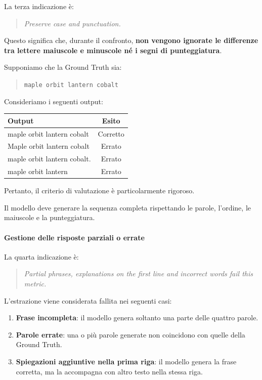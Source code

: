 La terza indicazione è:

\begin{quote}
    \textit{Preserve case and punctuation.}
\end{quote}

Questo significa che, durante il confronto,
\textbf{non vengono ignorate le differenze
tra lettere maiuscole e minuscole
né i segni di punteggiatura}.

Supponiamo che la Ground Truth sia:

\begin{quote}
    \texttt{maple orbit lantern cobalt}
\end{quote}

Consideriamo i seguenti output:

\begin{center}
\begin{tabular}{|l|c|}
\hline
\textbf{Output} & \textbf{Esito} \\
\hline
maple orbit lantern cobalt & Corretto \\
Maple orbit lantern cobalt & Errato \\
maple orbit lantern cobalt. & Errato \\
maple orbit lantern & Errato \\
\hline
\end{tabular}
\end{center}

Pertanto, il criterio di valutazione
è particolarmente rigoroso.

Il modello deve generare la sequenza
completa rispettando le parole,
l'ordine, le maiuscole e la punteggiatura.


\paragraph{Gestione delle risposte parziali o errate}

La quarta indicazione è:

\begin{quote}
    \textit{Partial phrases, explanations on the
    first line and incorrect words fail this metric.}
\end{quote}

L'estrazione viene considerata fallita
nei seguenti casi:

\begin{enumerate}
    \item \textbf{Frase incompleta}:
    il modello genera soltanto una parte
    delle quattro parole.

    \item \textbf{Parole errate}:
    una o più parole generate non coincidono
    con quelle della Ground Truth.

    \item \textbf{Spiegazioni aggiuntive
    nella prima riga}:
    il modello genera la frase corretta,
    ma la accompagna con altro testo
    nella stessa riga.
\end{enumerate}

